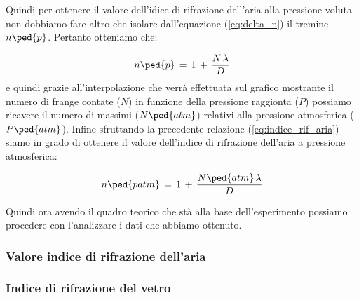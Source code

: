 Quindi per ottenere il valore dell'idice di rifrazione dell'aria alla pressione voluta non dobbiamo fare altro che isolare dall'equazione (\ref{eq:delta_n}) il tremine $n\ped{p}$. Pertanto otteniamo che:

\begin{equation}
	n\ped{p} \,=\, 1 \,+\, \frac{N \, \lambda}{D}
	\label{eq:indice_rif_aria}
\end{equation}
%
e quindi grazie all'interpolazione che verrà effettuata sul grafico mostrante il numero di frange contate ($N$) in funzione della pressione raggionta ($P$) possiamo ricavere il numero di massimi ($N\ped{atm}$) relativi alla pressione atmosferica ($P\ped{atm}$). Infine sfruttando la precedente relazione (\ref{eq:indice_rif_aria}) siamo in grado di ottenere il valore dell'indice di rifrazione dell'aria a pressione atmosferica:

\begin{equation}
	n\ped{patm} \,=\, 1 \,+\, \frac{N\ped{atm} \, \lambda}{D}
	\label{eq:indice_rif_aria}
\end{equation}
%

Quindi ora avendo il quadro teorico che stà alla base dell'esperimento possiamo procedere con l'analizzare i dati che abbiamo ottenuto.

\subsubsection{Valore indice di rifrazione dell'aria}

\subsubsection{Indice di rifrazione del vetro}
